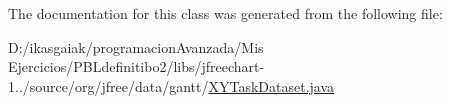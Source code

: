 The documentation for this class was generated from the following file\+:\begin{DoxyCompactItemize}
\item 
D\+:/ikasgaiak/programacion\+Avanzada/\+Mis Ejercicios/\+P\+B\+Ldefinitibo2/libs/jfreechart-\/1../source/org/jfree/data/gantt/\mbox{\hyperlink{_x_y_task_dataset_8java}{X\+Y\+Task\+Dataset.\+java}}\end{DoxyCompactItemize}
